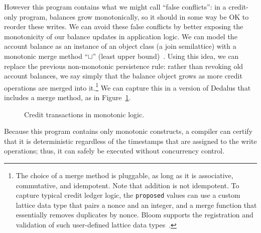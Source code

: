\documentclass{sig-alternate}
\begin{document}
However this program contains what we might call ``false conflicts'': in a credit-only program, balances grow monotonically, so it should in some way be OK to reorder these writes.  We can avoid these false conflicts by better exposing the monotonicity of our balance updates in application logic. We
can model the account balance as an instance of an object class (a join semilattice) with a monotonic merge method ``$\sqcup$'' (least upper bound)~\cite{Conway2012}. Using this idea, we can replace the previous non-monotonic persistence rule: rather than revoking old account balances,
we say simply that the balance object grows as more credit operations are merged into it.\footnote{The choice of a merge method is pluggable, as long as it is associative, commutative, and idempotent. Note that addition is not idempotent.  To capture typical credit ledger logic, the \texttt{proposed} values can use a custom lattice data type that pairs a nonce and an integer, and a merge function that essentially removes duplicates by nonce.  Bloom supports the registration and validation of such user-defined lattice data types~\cite{Conway2012}.}  We can capture this in a version of Dedalus that includes a merge method, as in Figure~\ref{fig:lattice_balance}.

\begin{figure}[t]
\begin{scriptsize}

\centering
\vspace{-10pt}
\caption{Credit transactions in monotonic logic.}
\label{fig:lattice_balance}
\end{scriptsize}
\vspace{-2pt}
\end{figure}

Because this program contains only monotonic constructs, a compiler can 
certify that it is deterministic regardless of the timestamps that are
assigned to the write operations; thus, it can safely be executed without
concurrency control. 
\end{document}
